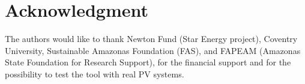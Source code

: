 \documentclass[journal]{IEEEtran}
\begin{document}

%





\section*{Acknowledgment}
The authors would like to thank Newton Fund (Star Energy project), Coventry University, Sustainable Amazonas Foundation (FAS), and FAPEAM (Amazonas State Foundation for Research Support), for the financial support and for the possibility to test the tool with real PV systems.

\end{document}
